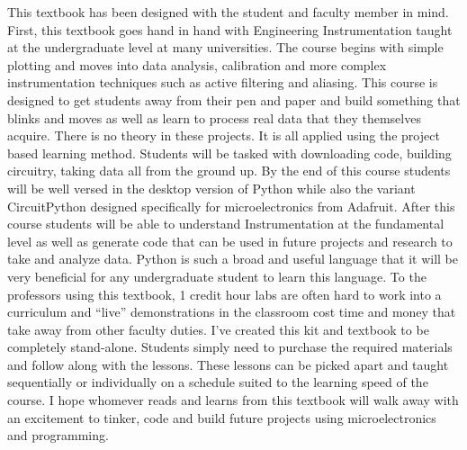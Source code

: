 This textbook has been designed with the student and faculty member in
mind. First, this textbook goes hand in hand with Engineering
Instrumentation taught at the undergraduate level at many
universities. The course begins with simple plotting and moves into
data analysis, calibration and more complex instrumentation techniques
such as active filtering and aliasing. This course is designed to get
students away from their pen and paper and build something that blinks
and moves as well as learn to process real data that they themselves
acquire. There is no theory in these projects. It is all applied using
the project based learning method. Students will be tasked with
downloading code, building circuitry, taking data all from the ground
up. By the end of this course students will be well versed in the
desktop version of Python while also the variant CircuitPython
designed specifically for microelectronics from Adafruit. After this
course students will be able to understand Instrumentation at the
fundamental level as well as generate code that can be used in future
projects and research to take and analyze data. Python is such a broad
and useful language that it will be very beneficial for any
undergraduate student to learn this language. To the professors using
this textbook, 1 credit hour labs are often hard to work into a
curriculum and “live” demonstrations in the classroom cost time and
money that take away from other faculty duties. I’ve created this kit
and textbook to be completely stand-alone. Students simply need to
purchase the required materials and follow along with the
lessons. These lessons can be picked apart and taught sequentially or
individually on a schedule suited to the learning speed of the
course. I hope whomever reads and learns from this textbook will walk
away with an excitement to tinker, code and build future projects
using microelectronics and programming.

\newpage

\tableofcontents

